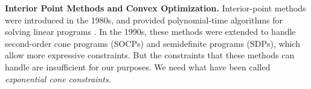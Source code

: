 \documentclass{article}
\begin{document}
%
\textbf{Interior Point Methods and Convex Optimization.}
%
Interior-point methods  were introduced in the 1980s, and provided
polynomial-time algorithms for solving linear programs  \parencite{???}.
In the 1990s, these methods were extended to handle second-order cone programs (SOCPs) and semidefinite programs (SDPs), which allow more expressive constraints.
But the constraints that these methods can handle are insufficient for
our purposes. We need what have been called \emph{exponential cone constraints}.
\end{document}
